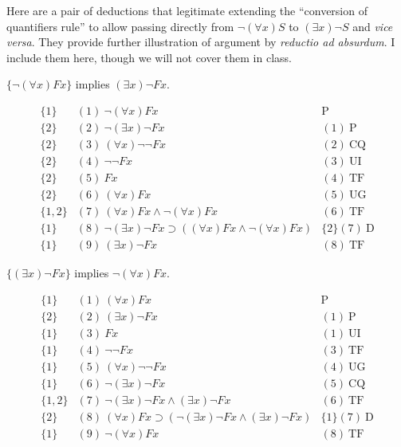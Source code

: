Here are a pair of deductions that legitimate extending the ``conversion of quantifiers rule'' to allow passing directly from $\neg(\forall x)S$ to $(\exists x)\neg S$ and \emph{vice versa}. They provide further illustration of argument by \emph{reductio ad absurdum}. I include them here, though we will not cover them in class.
\begin{center}
$\{\neg(\forall x)Fx\}$ implies $(\exists x)\neg Fx.$
\end{center}
\[
\begin{array}{lll}
\{1\}   & (1)\  \neg(\forall x)Fx &  \mathrm{P}\\
\{2\}   & (2)\ \neg(\exists x)\neg Fx & (1) \ \mathrm{P}\\
\{2\}   & (3)\ (\forall x)\neg\neg Fx &  (2)\ \mathrm{CQ}\\
\{2\}   & (4)\ \neg\neg Fx   & (3)\ \mathrm{UI}\\
\{2\}   & (5)\ Fx   & (4)\ \mathrm{TF}\\
\{2\}   & (6)\ (\forall x)Fx  & (5)\ \mathrm{UG}\\
\{1,2\}   & (7)\ (\forall x)Fx\wedge\neg(\forall x)Fx  & (6)\ \mathrm{TF}\\
\{1\}   & (8)\ \neg(\exists x)\neg Fx\supset((\forall x)Fx\wedge\neg(\forall x)Fx)  & \{2\}(7)\ \mathrm{D}\\
\{1\}   & (9)\ (\exists x)\neg Fx  & (8)\ \mathrm{TF}
\end{array}
\]
\begin{center}
$\{(\exists x)\neg Fx\}$ implies $\neg(\forall x)Fx.$
\end{center}
\[
\begin{array}{lll}
\{1\}   & (1)\  (\forall x)Fx &  \mathrm{P}\\
\{2\}   & (2)\ (\exists x)\neg Fx & (1) \ \mathrm{P}\\
\{1\}   & (3)\ Fx &  (1)\ \mathrm{UI}\\
\{1\}   & (4)\ \neg\neg Fx   & (3)\ \mathrm{TF}\\
\{1\}   & (5)\ (\forall x)\neg\neg Fx   & (4)\ \mathrm{UG}\\
\{1\}   & (6)\ \neg(\exists x)\neg Fx  & (5)\ \mathrm{CQ}\\
\{1,2\}   & (7)\ \neg(\exists x)\neg Fx\wedge(\exists x)\neg Fx  & (6)\ \mathrm{TF}\\
\{2\}   & (8)\ (\forall x)Fx\supset(\neg(\exists x)\neg Fx\wedge(\exists x)\neg Fx)  & \{1\}(7)\ \mathrm{D}\\
\{1\}   & (9)\ \neg(\forall x)Fx  & (8)\ \mathrm{TF}
\end{array}
\]
